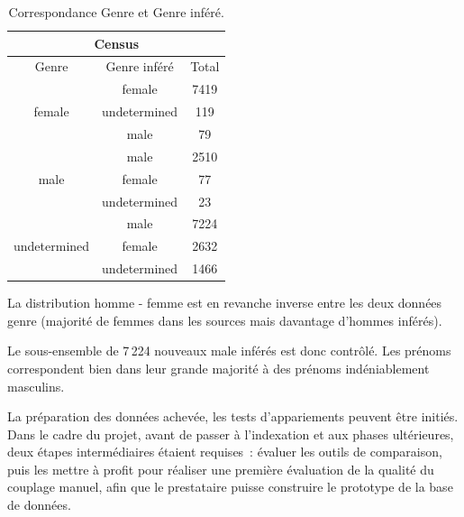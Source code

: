 \documentclass[a4paper,12pt,twoside]{book}
\begin{document}
    	            \begin{table}[htbp]
    	            \centering
                    \renewcommand\cellalign{cl}
    			        \begin{tabular}{|c|c|c|}
    			        \hline
    			            \multicolumn{3}{|c|}{Census}\\\hline
    			            Genre & Genre inféré & Total \\\hline
    			            \multirow{3}{*}{female} & female & 7419 \\
                             & undetermined & 119 \\
                             & male & 79 \\\hline
                            \multirow{3}{*}{male} & male & 2510\\
                             & female & 77 \\
                             & undetermined & 23 \\\hline
                             \multirow{3}{*}{undetermined} & male & 7224\\
                             & female & 2632 \\
                             & undetermined & 1466 \\\hline
                        \end{tabular}
                    \caption{Correspondance Genre et Genre inféré.}\label{tab11}
    			    \end{table}   
	                \vspace{-0.8em}
	                
	                La distribution homme - femme est en revanche inverse entre les deux données genre (majorité de femmes dans les sources mais davantage d'hommes inférés).
	                
	                Le sous-ensemble de 7\,224 nouveaux \og{}male\fg{} inférés est donc contrôlé. Les prénoms correspondent bien dans leur grande majorité à des prénoms indéniablement masculins.
	                \newline
	                
	                La préparation des données achevée, les tests d'appariements peuvent être initiés. Dans le cadre du projet, avant de passer à l'indexation et aux phases ultérieures, deux étapes intermédiaires étaient requises~: évaluer les outils de comparaison, puis les mettre à profit pour réaliser une première évaluation de la qualité du couplage manuel, afin que le prestataire puisse construire le prototype de la base de données.
	                \pagebreak
\end{document}
